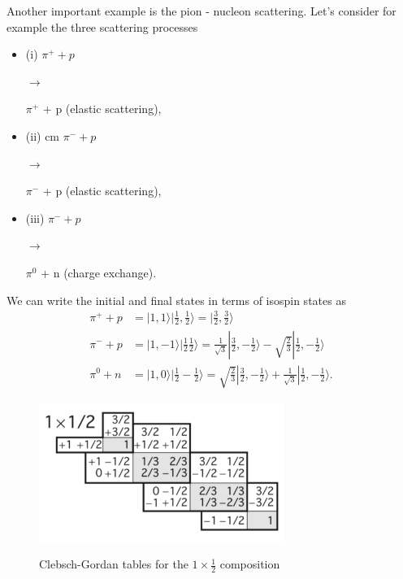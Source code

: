 Another important example is the pion - nucleon scattering. Let's consider for example the three scattering processes
\begin{itemize}
    \item(i)\hskip 0.5cm $\pi^+ +p $ \begin{large} $\rightarrow$ \end{large} $\pi^+$ + p \hskip 1cm (elastic scattering),
    \item(ii) cm $\pi^- +p $ \begin{large} $\rightarrow$ \end{large} $\pi^-$ + p \hskip 1cm (elastic scattering),
\item(iii)\hskip 0.4cm  $\pi^- +p $ \begin{large} $\rightarrow$ \end{large} $\pi^0$ + n \hskip 1cm (charge exchange).
\end{itemize}
We can write the initial and final states in terms of isospin states as
\begin{align*}
\pi^+ +p&=|1,1\rangle |\frac{1}{2}, \frac{1}{2}\rangle=|\frac{3}{2} ,\frac{3}{2}\rangle\\
\pi^- +p&=|1,-1\rangle |\frac{1}{2} \frac{1}{2}\rangle=\frac{1}{\sqrt{3}}|\frac{3}{2} ,-\frac{1}{2}\rangle-\sqrt{\frac{2}{3}}|\frac{1}{2}, -\frac{1}{2}\rangle\\
\pi^0 +n&=|1,0\rangle |\frac{1}{2} -\frac{1}{2}\rangle=\sqrt{\frac{2}{3}}|\frac{3}{2} ,-\frac{1}{2}\rangle+\frac{1}{\sqrt{3}}|\frac{1}{2}, -\frac{1}{2}\rangle.
\end{align*}
\begin{figure}[h!]
\begin{center}
  \includegraphics[width=8cm]{Figures/Simmetrie-pagine-2.pdf}\\
  \caption{Clebsch-Gordan tables for the $1\times\frac{1}{2}$ composition}
\end{center}
\end{figure}

